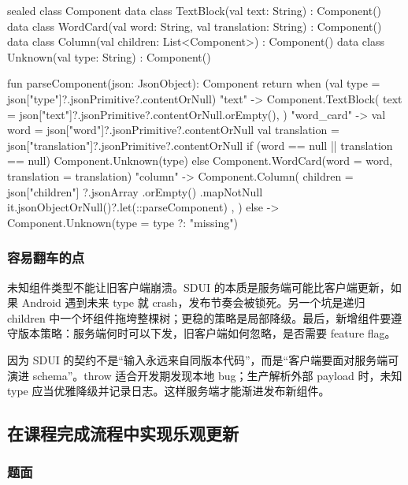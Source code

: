 \begin{kotlin}
sealed class Component {
    data class TextBlock(val text: String) : Component()
    data class WordCard(val word: String, val translation: String) : Component()
    data class Column(val children: List<Component>) : Component()
    data class Unknown(val type: String) : Component()
}

fun parseComponent(json: JsonObject): Component {
    return when (val type = json["type"]?.jsonPrimitive?.contentOrNull) {
        "text" -> Component.TextBlock(
            text = json["text"]?.jsonPrimitive?.contentOrNull.orEmpty(),
        )
        "word_card" -> {
            val word = json["word"]?.jsonPrimitive?.contentOrNull
            val translation = json["translation"]?.jsonPrimitive?.contentOrNull
            if (word == null || translation == null) {
                Component.Unknown(type)
            } else {
                Component.WordCard(word = word, translation = translation)
            }
        }
        "column" -> Component.Column(
            children = json["children"]
                ?.jsonArray
                .orEmpty()
                .mapNotNull { it.jsonObjectOrNull()?.let(::parseComponent) },
        )
        else -> Component.Unknown(type = type ?: "missing")
    }
}
\end{kotlin}

\subsubsection*{容易翻车的点}

未知组件类型不能让旧客户端崩溃。SDUI 的本质是服务端可能比客户端更新，如果 Android 遇到未来 type 就 crash，发布节奏会被锁死。另一个坑是递归 children 中一个坏组件拖垮整棵树；更稳的策略是局部降级。最后，新增组件要遵守版本策略：服务端何时可以下发，旧客户端如何忽略，是否需要 feature flag。

\begin{followup}
因为 SDUI 的契约不是“输入永远来自同版本代码”，而是“客户端要面对服务端可演进 schema”。throw 适合开发期发现本地 bug；生产解析外部 payload 时，未知 type 应当优雅降级并记录日志。这样服务端才能渐进发布新组件。
\end{followup}

\subsection{在课程完成流程中实现乐观更新}

\subsubsection*{题面}

